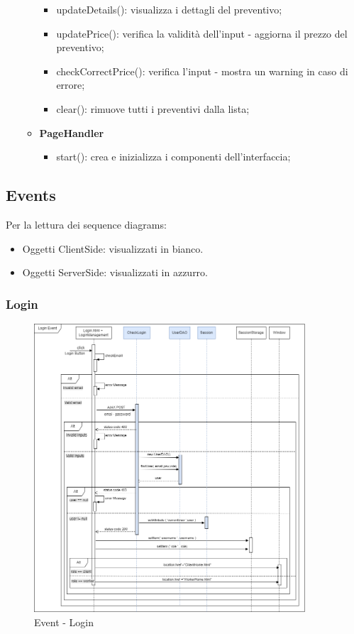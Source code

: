 \documentclass[a4paper, 12pt]{article}
\begin{document}
\begin{itemize}
\begin{itemize}
\begin{itemize}
			\item updateDetails(): visualizza i dettagli del preventivo;
			\item updatePrice(): verifica la validità dell'input - aggiorna il prezzo del preventivo;
			\item checkCorrectPrice(): verifica l'input - mostra un warning in caso di errore;
			\item clear(): rimuove tutti i preventivi dalla lista;
		\end{itemize}
		\item \textbf{PageHandler}
		\begin{itemize}
			\item start(): crea e inizializza i componenti dell'interfaccia;
		\end{itemize}
	\end{itemize}
\end{itemize}
\newpage
\subsection{Events}
Per la lettura dei sequence diagrams:
\begin{itemize}
	\item Oggetti ClientSide: visualizzati in bianco. 
	\item Oggetti ServerSide: visualizzati in azzurro. 
\end{itemize}
\subsubsection{Login}
\begin{figure}[h!]
	\centering
	\includegraphics[width=0.9\textwidth]{RIA_images/LoginEvent.png}
	\caption{Event - Login}
	\label{figure:LoginRIA}
\end{figure}
\newpage
\end{document}
